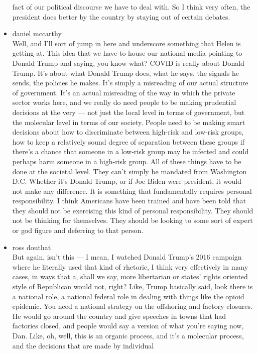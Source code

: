 \begin{itemize}
  fact of our political discourse we have to deal with. So I think very
  often, the president does better by the country by staying out of
  certain debates.
\item
  daniel mccarthy\\
  Well, and I'll sort of jump in here and underscore something that
  Helen is getting at. This idea that we have to house our national
  media pointing to Donald Trump and saying, you know what? COVID is
  really about Donald Trump. It's about what Donald Trump does, what he
  says, the signals he sends, the policies he makes. It's simply a
  misreading of our actual structure of government. It's an actual
  misreading of the way in which the private sector works here, and we
  really do need people to be making prudential decisions at the very
  --- not just the local level in terms of government, but the molecular
  level in terms of our society. People need to be making smart
  decisions about how to discriminate between high-risk and low-risk
  groups, how to keep a relatively sound degree of separation between
  these groups if there's a chance that someone in a low-risk group may
  be infected and could perhaps harm someone in a high-risk group. All
  of these things have to be done at the societal level. They can't
  simply be mandated from Washington D.C. Whether it's Donald Trump, or
  if Joe Biden were president, it would not make any difference. It is
  something that fundamentally requires personal responsibility. I think
  Americans have been trained and have been told that they should not be
  exercising this kind of personal responsibility. They should not be
  thinking for themselves. They should be looking to some sort of expert
  or god figure and deferring to that person.
\item
  ross douthat\\
  But again, isn't this --- I mean, I watched Donald Trump's 2016
  campaign where he literally used that kind of rhetoric, I think very
  effectively in many cases, in ways that a, shall we say, more
  libertarian or states' rights oriented style of Republican would not,
  right? Like, Trump basically said, look there is a national role, a
  national federal role in dealing with things like the opioid epidemic.
  You need a national strategy on the offshoring and factory closures.
  He would go around the country and give speeches in towns that had
  factories closed, and people would say a version of what you're saying
  now, Dan. Like, oh, well, this is an organic process, and it's a
  molecular process, and the decisions that are made by individual

\end{itemize}
